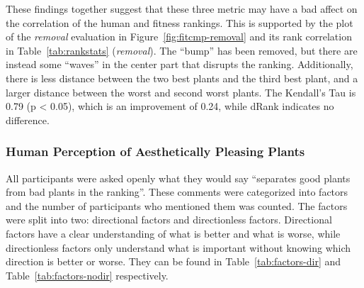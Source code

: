 These findings together suggest that these three metric may have a bad affect on the correlation of the human and fitness rankings.
This is supported by the plot of the \textit{removal} evaluation in Figure~\ref{fig:fitcmp-removal} and its rank correlation in Table~\ref{tab:rankstats} (\textit{removal}).
The ``bump'' has been removed, but there are instead some ``waves'' in the center part that disrupts the ranking.
Additionally, there is less distance between the two best plants and the third best plant, and a larger distance between the worst and second worst plants.
The Kendall's Tau is 0.79 (p < 0.05), which is an improvement of 0.24, while dRank indicates no difference.

\subsubsection{Human Perception of Aesthetically Pleasing Plants}
All participants were asked openly what they would say ``separates good plants from bad plants in the ranking''.
These comments were categorized into factors and the number of participants who mentioned them was counted.
The factors were split into two: directional factors and directionless factors.
Directional factors have a clear understanding of what is better and what is worse, while directionless factors only understand what is important without knowing which direction is better or worse.
They can be found in Table~\ref{tab:factors-dir} and Table~\ref{tab:factors-nodir} respectively.

